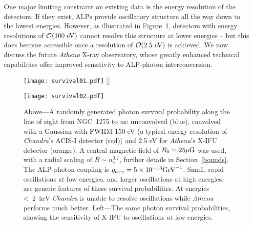 \documentclass[fleqn,usenatbib,useAMS]{mnras}
\begin{document}
One major limiting constraint on existing data is the energy resolution of the detectors.
If they exist, ALPs provide oscillatory structure all the way down to the lowest energies.
However, as illustrated in Figure~\ref{fig:ALPPhotonConversion}, detectors with energy resolutions of $\mathcal{O}(100~\rm{eV})$ cannot resolve this structure at lower energies -- but this does become accessible once a resolution of $\mathcal{O}(2.5~\rm{eV})$ is achieved.  We now discuss the future {\it Athena} X-ray observatory, whose greatly enhanced technical capabilities offer improved sensitivity to ALP-photon interconversion.
\begin{figure*}
\texttt{[image: survival01.pdf]} %
[\FBwidth]
{\caption{Above---A randomly generated photon survival probability along the line of sight from NGC~1275 to us: unconvolved (blue), convolved with a Gaussian with FWHM 150 eV (a typical energy resolution of {\it Chandra}'s ACIS-I detector (red)) and 2.5 eV for {\it Athena}'s X-IFU detector (orange). A central magnetic field of $B_0 = 25 \mu \rm{G}$ was used, with a radial scaling of $B \sim n_e^{0.7}$, further details in Section~\ref{bounds}. The ALP-photon coupling is ${g_{a\gamma\gamma} = 5 \times 10^{-13} {\rm GeV}^{-1}}$. Small, rapid oscillations at low energies, and larger oscillations at high energies, are generic features of these survival probabilities. At energies <~2~keV {\it Chandra} is unable to resolve oscillations while {\it Athena} performs much better. Left---The same photon survival probabilities, showing the sensitivity of X-IFU to oscillations at low energies.}\label{fig:ALPPhotonConversion}}
{\texttt{[image: survival02.pdf]}}


\end{figure*}
\end{document}
